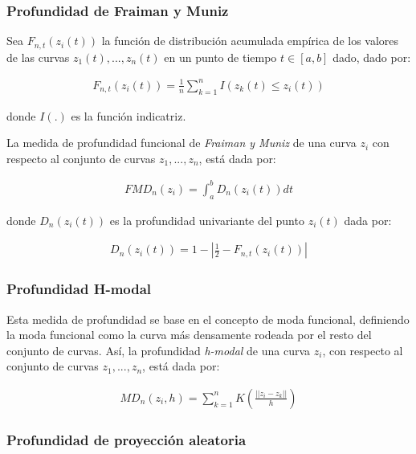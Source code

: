 \documentclass[
]{book}
\begin{document}
\hypertarget{profundidad-de-fraiman-y-muniz}{%
\subsubsection*{Profundidad de Fraiman y Muniz}\label{profundidad-de-fraiman-y-muniz}}

Sea \(F_{n,t}(z_i(t))\) la función de distribución acumulada empírica de los valores de las curvas \(z_1(t),...,z_n(t)\) en un punto de tiempo \(t\in [a,b]\) dado, dado por:

\begin{align*}
    F_{n,t}(z_i(t))=\frac{1}{n}\sum_{k=1}^n I(z_k(t)\leq z_i(t))
\end{align*}

donde \(I(.)\) es la función indicatriz.

La medida de profundidad funcional de \emph{Fraiman y Muniz} de una curva \(z_i\) con respecto al conjunto de curvas \(z_1,...,z_n\), está dada por:

\begin{align*}
    FMD_n(z_i)=\int_a^bD_n(z_i(t))dt
\end{align*}

donde \(D_n(z_i(t))\) es la profundidad univariante del punto \(z_i(t)\) dada por:

\begin{align*}
    D_n(z_i(t))=1-\left|\frac{1}{2}-F_{n,t}(z_i(t))\right|
\end{align*}

\hypertarget{profundidad-h-modal}{%
\subsubsection*{Profundidad H-modal}\label{profundidad-h-modal}}

Esta medida de profundidad se base en el concepto de moda funcional, definiendo la moda funcional como la curva más densamente rodeada por el resto del conjunto de curvas. Así, la profundidad \emph{h-modal} de una curva \(z_i\), con respecto al conjunto de curvas \(z_1,...,z_n\), está dada por:

\begin{align*}
    MD_n(z_i,h)=\sum_{k=1}^n  K\left( \frac{||z_i-z_k||}{h}\right)
\end{align*}

\hypertarget{profundidad-de-proyecciuxf3n-aleatoria}{%
\subsubsection*{Profundidad de proyección aleatoria}\label{profundidad-de-proyecciuxf3n-aleatoria}}
\end{document}
